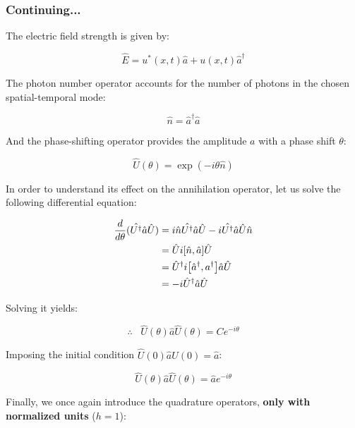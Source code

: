 \documentclass[12pt,a4paper]{report}
\begin{document}
\subsubsection{Continuing...}

The electric field strength is given by:

\begin{equation}
    \hat{E}=u^*(x,t)\hat{a}+u(x,t)\hat{a}^\dag
\end{equation}

The photon number operator accounts for the number of photons in the chosen spatial-temporal mode:

\begin{equation}
    \hat{n}=\hat{a}^\dag \hat{a}
\end{equation}

And the phase-shifting operator provides the amplitude $a$ with a phase shift $\theta$:

\begin{equation}
    \hat{U}(\theta)=\exp(-i\theta\hat{n})
\end{equation}

In order to understand its effect on the annihilation operator, let us solve the following differential equation:

\begin{align*}
    \frac{d}{d\theta}(\hat{U^{\dag}}\hat{a}\hat{U})&=i\hat{n}\hat{U^{\dag}}\hat{a}\hat{U}-i\hat{U^{\dag}}\hat{a}\hat{U}\hat{n}\\
    &=\hat U i \comm{\hat n}{\hat a}\hat U\\
    &=\hat U^{\dag}i\comm{\hat a^{\dag}}{a^{\dag}}\hat a \hat U\\
    &=-i\hat U^{\dag}\hat a \hat U
\end{align*}

Solving it yields:

\begin{equation}
    \therefore\;\;\; \hat U(\theta) \hat a \hat U(\theta)=Ce^{-i\theta}
\end{equation}

Imposing the initial condition $\hat U(0)\hat a \hat U(0)=\hat a$:

\begin{equation}
    \boxed{\hat U(\theta) \hat a \hat U(\theta)=\hat ae^{-i\theta}}
\end{equation}

Finally, we once again introduce the quadrature operators, \textbf{only with normalized units} ($h=1$):
\end{document}
